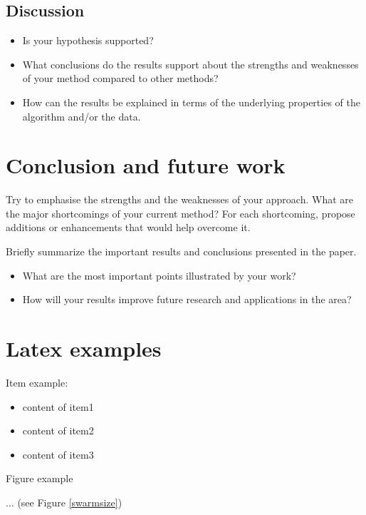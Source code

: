 \documentclass[runningheads,a4paper,11pt]{report}
\begin{document}
\section{Discussion}
\label{section:discussion}

\begin{itemize}
	\item Is your hypothesis supported? 
	\item What conclusions do the results support about the strengths and weaknesses of your method compared to other methods? 
	\item How can the results be explained in terms of the underlying properties of the algorithm and/or the data. 
\end{itemize}


\chapter{Conclusion and future work}
\label{chapter:concl}

Try to emphasise the strengths and the weaknesses of your approach.
What are the major shortcomings of your current method? For each shortcoming, propose additions or enhancements that would help overcome it. 

Briefly summarize the important results and conclusions presented in the paper. 

\begin{itemize}
	\item What are the most important points illustrated by your work? 
	\item How will your results improve future research and applications in the area? 
\end{itemize}


\chapter{Latex examples}

Item example: 

\begin{itemize}
	\item content of item1
 	\item content of item2
 	\item content of item3
\end{itemize}



Figure example 

$\ldots$ (see Figure \ref{swarmsize})
\end{document}
